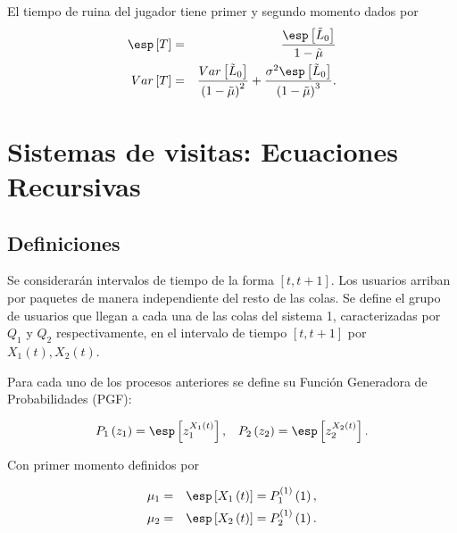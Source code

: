 \begin{Coro}
El tiempo de ruina del jugador tiene primer y segundo momento dados por
\begin{eqnarray}
\esp\left[T\right]&=&\frac{\esp\left[\tilde{L}_{0}\right]}{1-\tilde{\mu}}\\
Var\left[T\right]&=&\frac{Var\left[\tilde{L}_{0}\right]}{\left(1-\tilde{\mu}\right)^{2}}+\frac{\sigma^{2}\esp\left[\tilde{L}_{0}\right]}{\left(1-\tilde{\mu}\right)^{3}}.
\end{eqnarray}
\end{Coro}
\section{Sistemas de visitas: Ecuaciones Recursivas}



\subsection{Definiciones}

Se considerar\'an intervalos de tiempo de la forma
$\left[t,t+1\right]$. Los usuarios arriban por paquetes de manera
independiente del resto de las colas. Se define el grupo de
usuarios que llegan a cada una de las colas del sistema 1,
caracterizadas por $Q_{1}$ y $Q_{2}$ respectivamente, en el
intervalo de tiempo $\left[t,t+1\right]$ por
$X_{1}\left(t\right),X_{2}\left(t\right)$.



Para cada uno de los procesos anteriores se define su Funci\'on
Generadora de Probabilidades (PGF):

\begin{eqnarray*}
\begin{array}{cc}
P_{1}\left(z_{1}\right)=\esp\left[z_{1}^{X_{1}\left(t\right)}\right], & P_{2}\left(z_{2}\right)=\esp\left[z_{2}^{X_{2}\left(t\right)}\right].\\
\end{array}
\end{eqnarray*}

Con primer momento definidos por

\begin{eqnarray*}
\mu_{1}&=&\esp\left[X_{1}\left(t\right)\right]=P_{1}^{(1)}\left(1\right),\\
\mu_{2}&=&\esp\left[X_{2}\left(t\right)\right]=P_{2}^{(1)}\left(1\right).\\
\end{eqnarray*}


